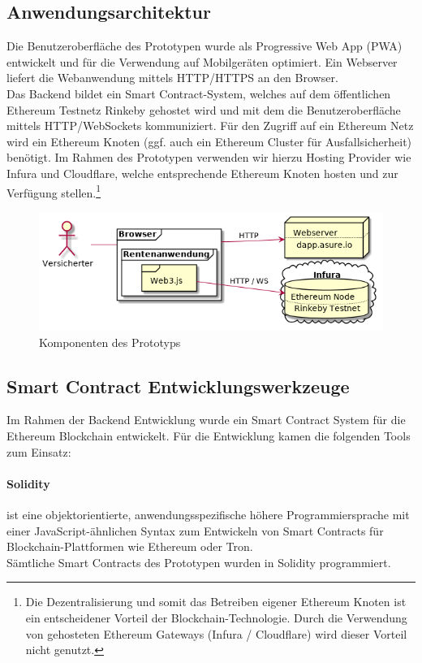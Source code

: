 \subsection{Anwendungsarchitektur}
Die Benutzeroberfläche des Prototypen wurde als Progressive Web App (PWA) entwickelt und für die Verwendung auf Mobilgeräten optimiert. Ein Webserver liefert die Webanwendung mittels HTTP/HTTPS an den Browser.
\\
Das Backend bildet ein Smart Contract-System, welches auf dem öffentlichen Ethereum Testnetz Rinkeby gehostet wird und mit dem die Benutzeroberfläche mittels HTTP/WebSockets kommuniziert. Für den Zugriff auf ein Ethereum Netz wird ein Ethereum Knoten (ggf. auch ein Ethereum Cluster für Ausfallsicherheit) benötigt. Im Rahmen des Prototypen verwenden wir hierzu Hosting Provider wie Infura und Cloudflare, welche entsprechende Ethereum Knoten hosten und zur Verfügung stellen.\footnote{Die Dezentralisierung und somit das Betreiben eigener Ethereum Knoten ist ein entscheidener Vorteil der Blockchain-Technologie. Durch die Verwendung von gehosteten Ethereum Gateways (Infura / Cloudflare) wird dieser Vorteil nicht genutzt.}

\begin{figure}
    \centering
    \includegraphics[width=6.0in]{images/components.png}
    \caption{Komponenten des Prototyps}
\end{figure}


\subsection*{Smart Contract Entwicklungswerkzeuge}
Im Rahmen der Backend Entwicklung wurde ein Smart Contract System für die Ethereum Blockchain entwickelt. Für die Entwicklung kamen die folgenden Tools zum Einsatz:

\paragraph*{Solidity} ist eine objektorientierte, anwendungsspezifische höhere Programmiersprache mit einer JavaScript-ähnlichen Syntax zum Entwickeln von Smart Contracts für Blockchain-Plattformen wie Ethereum oder Tron.\\ %
Sämtliche Smart Contracts des Prototypen wurden in Solidity programmiert.

